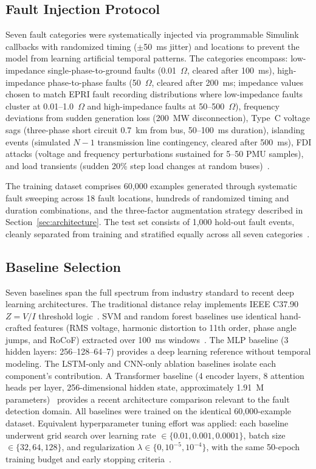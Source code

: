 \documentclass[journal]{IEEEtran}
\begin{document}
\subsection{Fault Injection Protocol}

Seven fault categories were systematically injected via programmable Simulink callbacks with randomized timing ($\pm$50~ms jitter) and locations to prevent the model from learning artificial temporal patterns. The categories encompass: low-impedance single-phase-to-ground faults (0.01~$\Omega$, cleared after 100~ms), high-impedance phase-to-phase faults (50~$\Omega$, cleared after 200~ms; impedance values chosen to match EPRI fault recording distributions where low-impedance faults cluster at 0.01--1.0~$\Omega$ and high-impedance faults at 50--500~$\Omega$), frequency deviations from sudden generation loss (200~MW disconnection), Type~C voltage sags (three-phase short circuit 0.7~km from bus, 50--100~ms duration), islanding events (simulated $N-1$ transmission line contingency, cleared after 500~ms), FDI attacks (voltage and frequency perturbations sustained for 5--50 PMU samples), and load transients (sudden 20\% step load changes at random buses)~\cite{ref34}.

The training dataset comprises 60,000 examples generated through systematic fault sweeping across 18 fault locations, hundreds of randomized timing and duration combinations, and the three-factor augmentation strategy described in Section~\ref{sec:architecture}. The test set consists of 1,000 hold-out fault events, cleanly separated from training and stratified equally across all seven categories~\cite{ref27}.

\subsection{Baseline Selection}

Seven baselines span the full spectrum from industry standard to recent deep learning architectures. The traditional distance relay implements IEEE C37.90 $Z = V/I$ threshold logic~\cite{ref3}. SVM and random forest baselines use identical hand-crafted features (RMS voltage, harmonic distortion to 11th order, phase angle jumps, and RoCoF) extracted over 100~ms windows~\cite{ref7,ref8}. The MLP baseline (3 hidden layers: 256--128--64--7) provides a deep learning reference without temporal modeling. The LSTM-only and CNN-only ablation baselines isolate each component's contribution. A Transformer baseline (4 encoder layers, 8 attention heads per layer, 256-dimensional hidden state, approximately 1.91~M parameters)~\cite{ref_khan} provides a recent architecture comparison relevant to the fault detection domain. All baselines were trained on the identical 60,000-example dataset. Equivalent hyperparameter tuning effort was applied: each baseline underwent grid search over learning rate $\in \{0.01, 0.001, 0.0001\}$, batch size $\in \{32, 64, 128\}$, and regularization $\lambda \in \{0, 10^{-5}, 10^{-4}\}$, with the same 50-epoch training budget and early stopping criteria~\cite{ref35}.
\end{document}
